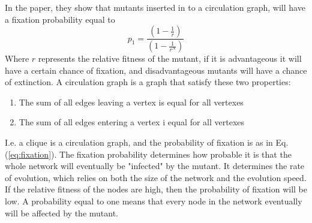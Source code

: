 In the \cite{lieberman2005evolutionary} paper, they show that mutants inserted in to a
 circulation graph, will have a fixation probability equal to
\begin{equation}  
p_{1}=\frac{(1-\frac{1}{r})}{(1-\frac{1}{r^{N}})}
 \label{eq:fixation} 
\end{equation}
Where $r$ represents the relative fitness of the mutant, if it is advantageous it will have a certain chance of fixation, and disadvantageous mutants will have a chance of extinction. 
A circulation graph is a graph that satisfy these two properties: 
\begin{enumerate}
\item The sum of all edges leaving a vertex is equal for all vertexes
\item The sum of all edges entering a vertex i equal for all vertexes
\end{enumerate}
I.e. a clique is a circulation graph, and the probability of fixation is as in Eq. (\ref{eq:fixation}).
The fixation probability determines how probable it is that the whole network will eventually be
"infected" by the mutant. It determines the rate of evolution, which relies on both the size of the
network and the evolution speed. 
If the relative fitness of the nodes are high, then the probability of fixation will be low.
A probability equal to one means that every node in the network eventually will be affected by the mutant.

